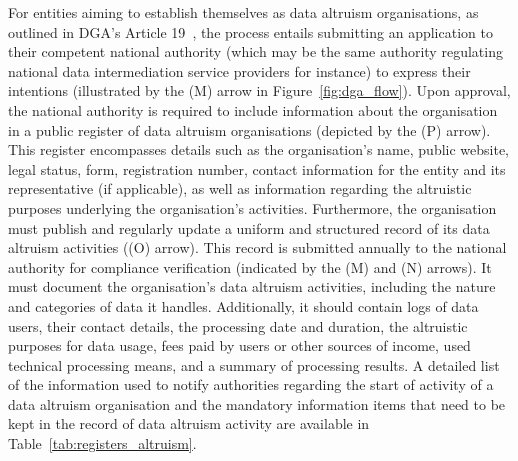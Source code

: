 For entities aiming to establish themselves as data altruism organisations, as outlined in DGA's Article 19~\citeyearpar{noauthor_regulation_2022}, the process entails submitting an application to their competent national authority (which may be the same authority regulating national data intermediation service providers for instance) to express their intentions (illustrated by the (M) arrow in Figure~\ref{fig:dga_flow}).
Upon approval, the national authority is required to include information about the organisation in a public register of data altruism organisations (depicted by the (P) arrow).
This register encompasses details such as the organisation's name, public website, legal status, form, registration number, contact information for the entity and its representative (if applicable), as well as information regarding the altruistic purposes underlying the organisation's activities.
Furthermore, the organisation must publish and regularly update a uniform and structured record of its data altruism activities ((O) arrow).
This record is submitted annually to the national authority for compliance verification (indicated by the (M) and (N) arrows).
It must document the organisation's data altruism activities, including the nature and categories of data it handles.
Additionally, it should contain logs of data users, their contact details, the processing date and duration, the altruistic purposes for data usage, fees paid by users or other sources of income, used technical processing means, and a summary of processing results.
A detailed list of the information used to notify authorities regarding the start of activity of a data altruism organisation and the mandatory information items that need to be kept in the record of data altruism activity are available in Table~\ref{tab:registers_altruism}.

